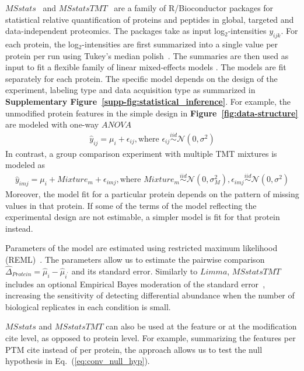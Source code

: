 \documentclass[mcp]{article}
\numberwithin{table}{section}
\def\eqref#1{Eq.~(\ref{eq:#1})}
\def\figref#1{{\bf Figure~\ref{fig:#1}}}
\begin{document}
$MSstats$~\cite{Choi:2014} and $MSstatsTMT$~\cite{Huang:2020} are a family of R/Bioconductor packages for statistical relative quantification of proteins and peptides in global, targeted and data-independent proteomics. The packages take as input log$_2$-intensities $y_{ijk}$. For each protein, the log$_2$-intensities are first summarized into a single value per protein per run using Tukey's median polish~\cite{Tukey:1977}. The summaries are then used as input to fit a flexible family of linear mixed-effects models \cite{McLean:1991, Faraway:2006, Bolker2009}. The models are fit separately for each protein. The specific model depends on the design of the experiment, labeling type and data acquisition type as summarized in {\bf Supplementary Figure~\ref{supp-fig:statistical_inference}}. For example, the unmodified protein features in the simple design in \figref{data-structure} are modeled with one-way $ANOVA$
\begin{eqnarray}
\hat{y}_{ij} = \mu_i + \epsilon_{ij}, \text{where } \epsilon_{ij} \stackrel{iid}{\sim} \mathcal{N}(0, \sigma^2)
\label{eq:msstats_model}
\end{eqnarray}
In contrast, a group comparison experiment with multiple TMT mixtures is modeled as
\begin{eqnarray}
\hat{y}_{imj} = \mu_i + Mixture_m + \epsilon_{imj}, \text{where } Mixture_m \stackrel{iid}{\sim} \mathcal{N}(0, \sigma_M^2), \epsilon_{imj} \stackrel{iid}{\sim} \mathcal{N}(0, \sigma^2)
\label{eq:msstatstmt_model}
\end{eqnarray}
Moreover, the model fit for a particular protein depends on the pattern of missing values in that protein. If some of the terms of the model reflecting the experimental design are not estimable, a simpler model is fit for that protein instead.

Parameters of the model are estimated using restricted maximum likelihood (REML)~\cite{Kenward}.
The parameters allow us to estimate the pairwise comparison $\hat{\Delta}_{Protein} = \hat{\mu}_{i} - \hat{\mu}_{i^{\prime}}$ and its standard error. Similarly to $Limma$, $MSstatsTMT$ includes an optional Empirical Bayes moderation of the standard error~\cite{Huang:2020},  increasing the sensitivity of detecting differential abundance when the number of biological replicates in each condition is small. 

$MSstats$ and $MSstatsTMT$ can  also be used at the feature or at the modification cite level, as opposed to protein level. For example, summarizing the features per PTM cite instead of per protein, the approach allows us to test the null hypothesis in \eqref{conv_null_hyp}.
\end{document}
